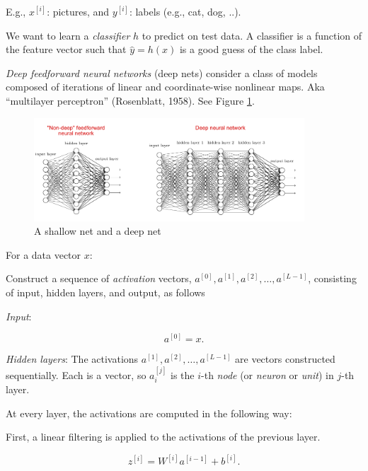 \documentclass[english]{article}
\begin{document}
E.g., $x^{[i]}$: pictures, and $y^{[i]}$: labels (e.g., cat, dog, ..).

 We want to learn a \emph{classifier} $h$ to predict on test data. A classifier is a function of the feature vector such that $\hat y = h(x)$ is a good guess of the class label.



\item \emph{Deep feedforward neural networks} (deep nets) consider a class of models composed of iterations of linear and coordinate-wise nonlinear maps. Aka ``multilayer perceptron'' (Rosenblatt, 1958). See Figure \ref{dn}. 

\begin{figure}
  \centering
  \includegraphics[width=0.9\textwidth]{dn.png}
  \caption{A shallow net and a deep net}
  \label{dn}
\end{figure}



For a data vector $x$: 

Construct a sequence of \emph{activation} vectors, $a^{[0]}, a^{[1]}, a^{[2]}, \ldots, a^{[L-1]}$, consisting of input, hidden layers, and output, as follows

\benum 
\item  \emph{Input}: 

$$ a^{[0]}  = x.$$

\item  \emph{Hidden layers}: The activations $a^{[1]}, a^{[2]}, \ldots, a^{[L-1]}$ are vectors constructed sequentially. Each is a vector, so $a_i^{[j]}$ is the $i$-th \emph{node} (or \emph{neuron} or \emph{unit}) in $j$-th layer. 

At every layer, the activations are computed in the following way: 

\benum 

\item First, a linear filtering is applied to the activations of the previous layer. 

$$z^{[i]} = W^{[i]}a^{[i-1]}+b^{[i]}.$$
\end{document}
